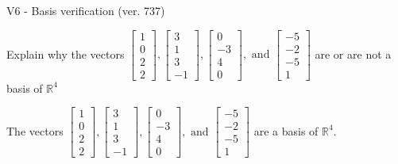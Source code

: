 \begin{exercise}
  \begin{exerciseTitle}V6 - Basis verification (ver. 737)\end{exerciseTitle}
  \begin{exerciseStatement}
    Explain why the vectors \(\left[\begin{array}{r}
1 \\
0 \\
2 \\
2
\end{array}\right] , \left[\begin{array}{r}
3 \\
1 \\
3 \\
-1
\end{array}\right] , \left[\begin{array}{r}
0 \\
-3 \\
4 \\
0
\end{array}\right] , \text{ and } \left[\begin{array}{r}
-5 \\
-2 \\
-5 \\
1
\end{array}\right]\) are or are not a basis of \(\mathbb{R}^4\)	


  \end{exerciseStatement}
  \begin{exerciseAnswer}
   The vectors \(\left[\begin{array}{r}
1 \\
0 \\
2 \\
2
\end{array}\right] , \left[\begin{array}{r}
3 \\
1 \\
3 \\
-1
\end{array}\right] , \left[\begin{array}{r}
0 \\
-3 \\
4 \\
0
\end{array}\right] , \text{ and } \left[\begin{array}{r}
-5 \\
-2 \\
-5 \\
1
\end{array}\right]\) 
  	 are  a basis of \(\mathbb{R}^4\).
  


  \end{exerciseAnswer}
\end{exercise}